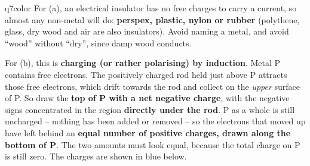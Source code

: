 \documentclass[11pt,a4paper]{article}
\begin{document}
\begin{ansbox}{q7color}
For (a), an electrical insulator has no free charges to carry a current, so almost any non-metal will do: \textbf{perspex, plastic, nylon or rubber} (polythene, glass, dry wood and air are also insulators). Avoid naming a metal, and avoid ``wood'' without ``dry'', since damp wood conducts.

For (b), this is \textbf{charging (or rather polarising) by induction}. Metal P contains free electrons. The positively charged rod held just above P attracts those free electrons, which drift towards the rod and collect on the \emph{upper} surface of P. So draw the \textbf{top of P with a net negative charge}, with the negative signs concentrated in the region \textbf{directly under the rod}. P as a whole is still uncharged -- nothing has been added or removed -- so the electrons that moved up have left behind an \textbf{equal number of positive charges, drawn along the bottom of P}. The two amounts must look equal, because the total charge on P is still zero. The charges are shown in blue below.
\begin{center}
\end{center}


\end{ansbox}
\end{document}
